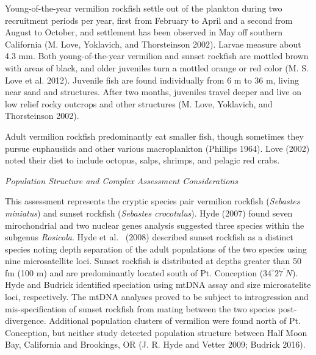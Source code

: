 \documentclass[11pt,
  english,
  a4paper,
]{article}
\begin{document}
Young-of-the-year vermilion rockfish settle out of the plankton during two recruitment periods per year, first from February to April and a second from August to October, and settlement has been observed in May off southern California {(M. Love, Yoklavich, and Thorsteinson 2002)\leavevmode\tagmcend\tagstructend}. Larvae measure about 4.3 mm. Both young-of-the-year vermilion and sunset rockfish are mottled brown with areas of black, and older juveniles turn a mottled orange or red color {(M. S. Love et al. 2012)\leavevmode\tagmcend\tagstructend}. Juvenile fish are found individually from 6 m to 36 m, living near sand and structures. After two months, juveniles travel deeper and live on low relief rocky outcrops and other structures {(M. Love, Yoklavich, and Thorsteinson 2002)\leavevmode\tagmcend\tagstructend}.

Adult vermilion rockfish predominantly eat smaller fish, though sometimes they pursue euphausiids and other various macroplankton {(Phillips 1964)\leavevmode\tagmcend\tagstructend}. Love {(2002)\leavevmode\tagmcend\tagstructend} noted their diet to include octopus, salps, shrimps, and pelagic red crabs.

\emph{Population Structure and Complex Assessment Considerations}

This assessment represents the cryptic species pair vermilion rockfish (\emph{Sebastes miniatus}) and sunset rockfish (\emph{Sebastes crocotulus}). Hyde {(2007)\leavevmode\tagmcend\tagstructend} found seven mirochondrial and two nuclear genes analysis suggested three species within the subgenus \emph{Rosicola}. Hyde et al.~ {(2008)\leavevmode\tagmcend\tagstructend} described sunset rockfish as a distinct species noting depth separation of the adult populations of the two species using nine microsatellite loci. Sunset rockfish is distributed at depths greater than 50 fm (100 m) and are predominantly located south of Pt. Conception ($34^\circ 27^\prime N$). Hyde and Budrick identified speciation using mtDNA assay and size microsatelite loci, respectively. The mtDNA analyses proved to be subject to introgression and mis-specification of sunset rockfish from mating between the two species post-divergence. Additional population clusters of vermilion were found north of Pt. Conception, but neither study detected population structure between Half Moon Bay, California and Brookings, OR {(J. R. Hyde and Vetter 2009; Budrick 2016)\leavevmode\tagmcend\tagstructend}.
\end{document}
